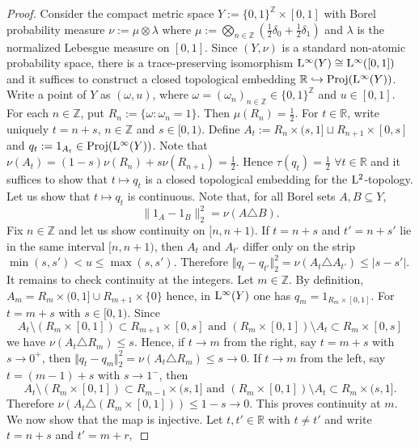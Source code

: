 \documentclass[12pt]{amsart} %
\theoremstyle{plain}
\theoremstyle{definition}
\newcommand{\R}{\mathbb{R}}
\newcommand{\Z}{\mathbb{Z}}
\DeclareMathOperator{\Proj}{Proj}
\begin{document}
\begin{proof}
Consider the compact metric space $Y:=\{0,1\}^{\mathbb Z}\times[0,1]$ with Borel probability measure
$\nu
        :=
       \mu\otimes \lambda$ where $\mu:=\bigotimes_{n\in\mathbb Z}
        \left(\frac12\delta_0+\frac12\delta_1\right)$ and $\lambda$ is the normalized Lebesgue measure on $[0,1]$. Since \((Y,\nu)\) is a standard non-atomic probability space, there is a
trace-preserving isomorphism ${\rm L}^\infty(Y)\cong {\rm L}^\infty([0,1])$ and it suffices to construct a closed topological embedding $\mathbb R\hookrightarrow \Proj({\rm L}^\infty(Y))$.
\medskip
\noindent Write a point of \(Y\) as \((\omega,u)\), where $\omega=(\omega_n)_{n\in\mathbb Z}\in\{0,1\}^{\mathbb Z}$ and $u\in[0,1]$. For each \(n\in\mathbb Z\), put $R_n:=\{\omega:\omega_n=1\}$. Then $\mu(R_n)=\frac12$. For \(t\in\mathbb R\), write uniquely $t=n+s$, $n\in\mathbb Z$ and  $s\in[0,1)$. Define
$A_t:=R_n\times(s,1]\sqcup R_{n+1}\times[0,s]$ and  $q_t:=1_{A_t}\in {\rm Proj}({\rm L}^\infty(Y))$. Note that $\nu(A_t)=(1-s)\nu(R_n)+s\nu(R_{n+1})=\frac12$. Hence $\tau(q_t)=\frac12$ $\forall t\in\mathbb R$ and it suffices to show that    $t\mapsto q_t$ is a closed topological embedding for the \({\rm L}^2\)-topology.
\medskip
\noindent Let us show that $t\mapsto q_t$ is continuous. Note that, for all Borel sets $A,B\subseteq Y$,
$$\|1_A-1_B\|_2^2=\nu(A\triangle B).$$
Fix $n\in\Z$ and let us show continuity on $[n,n+1)$. If \(t=n+s\) and \(t'=n+s'\) lie in the same interval
\([n,n+1)\), then \(A_t\) and \(A_{t'}\) differ only on the strip $\min(s,s')<u\leq \max(s,s')$. Therefore
$\Vert q_t-q_{t'}\Vert_2^2
        =
        \nu(A_t\triangle A_{t'})
        \leq |s-s'|$. It remains to check continuity at the integers. Let \(m\in\mathbb Z\). By
definition, $A_m=R_m\times(0,1]\cup R_{m+1}\times\{0\}$ hence, in ${\rm L}^\infty(Y)$ one has $q_m=1_{{R_m}\times[0,1]}$. For $t=m+s$ with $s\in [0,1)$. Since
$$A_t\setminus\left(R_m\times[0,1]\right)\subset R_{m+1}\times[0,s]\text{ and }\left(R_m\times[0,1]\right)\setminus A_t\subset R_m\times[0,s]$$
we have $ \nu(A_t\triangle R_m)\leq s$. Hence, if \(t\to m\) from the right, say \(t=m+s\) with \(s\to0^+\), then $\Vert q_t-q_m\Vert_2^2=\nu(A_t\triangle R_m)\leq s\to0$. If \(t\to m\) from the left, say \(t=(m-1)+s\) with \(s\to1^-\), then
$$A_t\setminus(R_m\times[0,1])\subset R_{m-1}\times(s,1]\text{ and }(R_m\times[0,1])\setminus A_t\subset R_m\times(s,1].$$
Therefore $\nu(A_t\triangle(R_m\times[0,1]))\leq 1-s\to0$. This proves continuity at \(m\).
\medskip
\noindent We now show that the map is injective. Let $t,t'\in\R$ with $t\neq t'$ and write $t=n+s$ and $t'=m+r,$

\end{proof}
\end{document}

